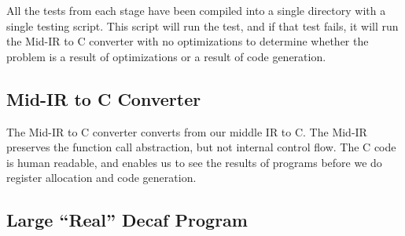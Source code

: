 \documentclass[11pt]{article}
\begin{document}
All the tests from each stage have been compiled into a single
directory with a single testing script. This script will run the test,
and if that test fails, it will run the Mid-IR to C converter with no
optimizations to determine whether the problem is a result of
optimizations or a result of code generation. 

\subsection {Mid-IR to C Converter} 

The Mid-IR to C converter converts from our middle IR to C. The Mid-IR
preserves the function call abstraction, but not internal control
flow. The C code is human readable, and enables us to see the results
of programs before we do register allocation and code generation.

\subsection {Large ``Real'' Decaf Program}
\end{document}
